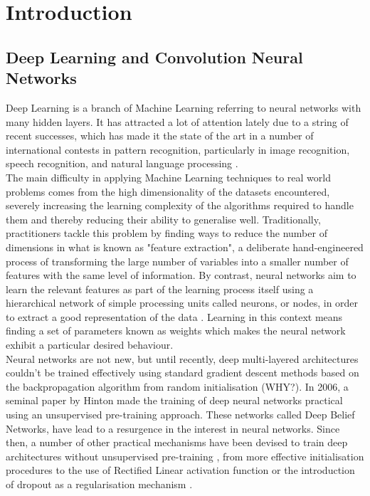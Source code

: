 \chapter{Introduction}

\section{Deep Learning and Convolution Neural Networks}

\noindent Deep Learning is a branch of Machine Learning referring to neural networks with many hidden layers. It has attracted a lot of attention lately \citep{NYT_article} due to a string of recent successes, which has made it the state of the art in a number of international contests in pattern recognition, particularly in image recognition, speech recognition, and natural language processing \citep{Deep_Learning_overview}. \\

\noindent The main difficulty in applying Machine Learning techniques to real world problems comes from the high dimensionality of the datasets encountered, severely increasing the learning complexity of the algorithms required to handle them and thereby reducing their ability to generalise well. Traditionally, practitioners tackle this problem by finding ways to reduce the number of dimensions in what is known as "feature extraction", a deliberate hand-engineered process of transforming the large number of variables into a smaller number of features with the same level of information. By contrast, neural networks aim to learn the relevant features as part of the learning process itself using a hierarchical network of simple processing units called neurons, or nodes, in order to extract a good representation of the data \citep{Bengio:2009:LDA:1658423.1658424}. Learning in this context means finding a set of parameters known as weights which makes the neural network exhibit a particular desired behaviour.\\

\noindent Neural networks are not new, but until recently, deep multi-layered architectures couldn't be trained effectively using standard gradient descent methods based on the backpropagation algorithm from random initialisation (WHY?). In 2006, a seminal paper by Hinton \citep{Hinton:2006:FLA:1161603.1161605} made the training of deep neural networks practical using an unsupervised pre-training approach. These networks called Deep Belief Networks, have lead to a resurgence in the interest in neural networks. Since then, a number of other practical mechanisms have been devised to train deep architectures without unsupervised pre-training \citep{Larochelle:2009:EST:1577069.1577070}, from more effective initialisation procedures \citep{Glorot10understandingthe} to the use of Rectified Linear activation function \citep{AISTATS2011_GlorotBB11} or the introduction of dropout as a regularisation mechanism \citep{JMLR:v15:srivastava14a}.\\

